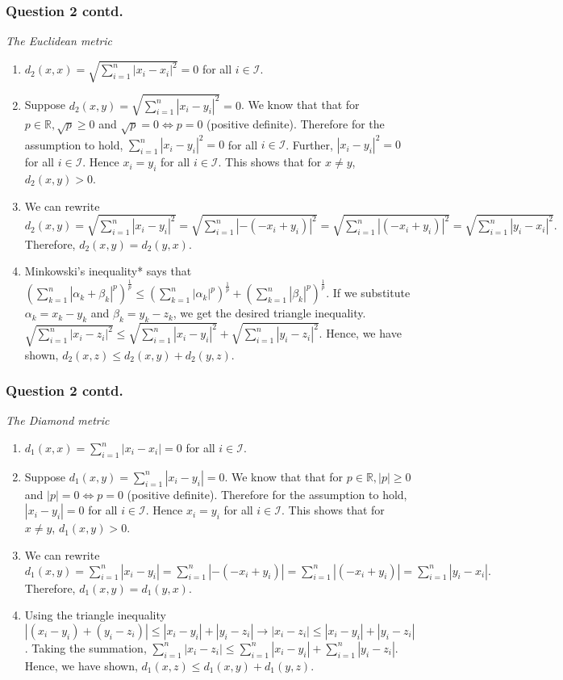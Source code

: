 \begin{frame}
\frametitle{Question 2 contd.}
\textit{The Euclidean metric}\hfill\break
\begin{enumerate}
    \item $d_2(x,x) = \sqrt{\sum_{i=1}^{n} |x_i - x_i|^2} = 0$ for all $i\in \mathcal{I}.$
    \item Suppose $d_2(x,y) = \sqrt{\sum_{i=1}^{n} |x_i - y_i|^2} = 0$. We know that that for $p \in \mathbb{R}, \sqrt{p}\geq0$ and $\sqrt{p} = 0 \iff p = 0$ (positive definite). Therefore for the assumption to hold, $\sum_{i=1}^{n} |x_i - y_i|^2 = 0$ for all $i \in \mathcal{I}$. Further, $ |x_i - y_i|^2 = 0$ for all $i \in \mathcal{I}$. Hence $x_i = y_i$ for all $i \in \mathcal{I}$. This shows that for $x\neq y$, $d_2(x,y)>0$.
    \item We can rewrite $d_2(x,y) = \sqrt{\sum_{i=1}^{n} |x_i - y_i|^2} = \sqrt{\sum_{i=1}^{n} |- (- x_i + y_i)|^2} = \sqrt{\sum_{i=1}^{n} |(- x_i + y_i)|^2} = \sqrt{\sum_{i=1}^{n} |y_i - x_i|^2}.$ Therefore, $d_2(x,y) = d_2(y,x).$
    \item Minkowski's inequality* says that $(\sum_{k=1}^{n}|\alpha_k+\beta_k|^p)^\frac{1}{p} \leq (\sum_{k=1}^{n}|\alpha_k|^p)^\frac{1}{p} + (\sum_{k=1}^{n}|\beta_k|^p)^\frac{1}{p}$. If we substitute $\alpha_k = x_k-y_k$ and $\beta_k = y_k - z_k$, we get the desired triangle inequality.
    $ \sqrt{\sum_{i=1}^{n} |x_i - z_i|^2} \leq  \sqrt{\sum_{i=1}^{n} |x_i - y_i|^2} +  \sqrt{\sum_{i=1}^{n} |y_i - z_i|^2}$.
    Hence, we have shown, $d_2(x,z) \leq d_2(x,y)+d_2(y,z).$
\end{enumerate}
\end{frame}

\begin{frame}
\frametitle{Question 2 contd.}
\textit{The Diamond metric}\hfill\break
\begin{enumerate}
    \item $d_1(x,x) = \sum_{i=1}^{n} |x_i - x_i| = 0$ for all $i\in \mathcal{I}.$
    \item Suppose $d_1(x,y) = \sum_{i=1}^{n} |x_i - y_i| = 0$. We know that that for $p \in \mathbb{R}, |p|\geq 0$ and $|p| = 0 \iff p = 0$ (positive definite). Therefore for the assumption to hold, $|x_i - y_i| = 0$ for all $i \in \mathcal{I}$. Hence $x_i = y_i$ for all $i \in \mathcal{I}$. This shows that for $x\neq y$, $d_1(x,y)>0$.
    \item We can rewrite $d_1(x,y) = \sum_{i=1}^{n} |x_i - y_i| = \sum_{i=1}^{n} |- (- x_i + y_i)| = \sum_{i=1}^{n} |(- x_i + y_i)| = \sum_{i=1}^{n} |y_i - x_i |.$ Therefore, $d_1(x,y) = d_1(y,x).$
    \item Using the triangle inequality $|(x_i - y_i) + (y_i - z_i)| \leq |x_i - y_i| + |y_i - z_i| \rightarrow |x_i - z_i| \leq |x_i - y_i| + |y_i - z_i|$. Taking the summation, $\sum_{i=1}^{n}|x_i - z_i| \leq \sum_{i=1}^{n}|x_i - y_i| + \sum_{i=1}^{n}|y_i - z_i|$. Hence, we have shown, $d_1(x,z) \leq d_1(x,y)+d_1(y,z).$
\end{enumerate}
\end{frame}

